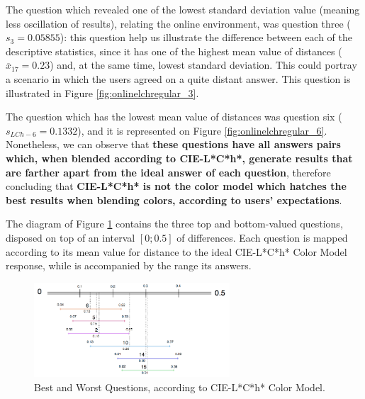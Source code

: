%
The question which revealed one of the lowest standard deviation value (meaning less oscillation of results), relating the online environment, was question three ($s_{3} = 0.05855$): this question help us
illustrate the difference between each of the descriptive statistics, since it has one of the highest mean value of distances ($\overline{x}_{17} = 0.23$) and, at the same time, lowest standard deviation. This could
portray a scenario in which the users agreed on a quite distant answer. This question is illustrated in Figure \ref{fig:onlinelchregular_3}. \par
%
The question which has the lowest mean value of distances was question six ($s_{LCh-6} = 0.1332$), and it is represented on Figure \ref{fig:onlinelchregular_6}. Nonetheless, we can observe that \textbf{these
questions have all answers pairs which, when blended according to CIE-L*C*h*, generate results that are farther apart from the ideal answer of each question}, therefore concluding that \textbf{CIE-L*C*h* is not
the color model which hatches the best results when blending colors, according to users' expectations}. \par
%
The diagram of Figure \ref{fig:lch_analysis} contains the three top and bottom-valued questions, disposed on top of an interval $[0 ; 0.5]$ of differences. Each question is mapped according to its mean value for
distance to the ideal CIE-L*C*h* Color Model response, while is accompanied by the range its answers. \par
%
\begin{figure}[!htbp]
  \centering
  \vspace{-15pt}
  \includegraphics[width=0.65\textwidth]{images/results/lch_questions_analysis.png}
  \caption[Best and Worst Questions, according to CIE-L*C*h* Color Model.]{Best and Worst Questions, according to CIE-L*C*h* Color Model.}
  \vspace{-5pt}
  \label{fig:lch_analysis}
\end{figure}
%
%
